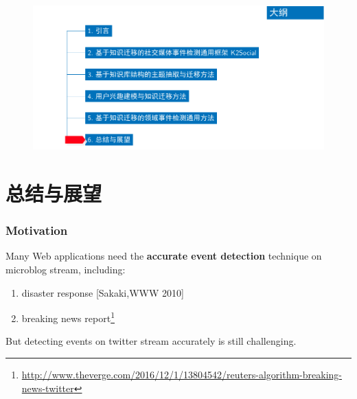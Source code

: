 \begin{frame}[plain]
\vspace*{-9.5mm}
\begin{figure}
	\hspace*{-4.2mm}
    \includegraphics[width=1.0\paperwidth]{img/contents6_output.pdf}
\end{figure}

\end{frame}

\section{总结与展望}
\begin{frame}
\frametitle{Motivation}

Many Web applications need the \textbf{accurate event detection} technique on microblog stream, including:
\begin{enumerate}
	\item disaster response [Sakaki,WWW 2010]
	\item breaking news report\footnote{\url{http://www.theverge.com/2016/12/1/13804542/reuters-algorithm-breaking-news-twitter}}
\end{enumerate}	
\vfill

But detecting events on twitter stream accurately is still challenging.
\end{frame}

